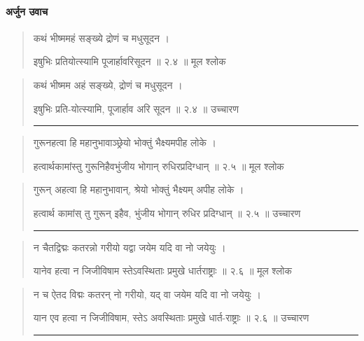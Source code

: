 \paragraph{\sanskrit अर्जुन उवाच}

\begin{quotation}

कथं भीष्ममहं सङ्‍ख्ये द्रोणं च मधुसूदन  ।  

इषुभिः प्रतियोत्स्यामि पूजार्हावरिसूदन  ॥ २.४ ॥  मूल श्लोक
\end{quotation}

\begin{quotation}

कथं भीष्मम अहं सङ्‍ख्ये, द्रोणं च मधुसूदन  ।  

इषुभिः प्रति-योत्स्यामि, पूजार्हाव अरि सूदन  ॥ २.४ ॥  उच्चारण

\noindent\rule{16cm}{0.4pt} 
\end{quotation}


\begin{quotation}
गुरूनहत्वा हि महानुभावाञ्छ्रेयो भोक्तुं भैक्ष्यमपीह लोके  ।  

हत्वार्थकामांस्तु गुरूनिहैवभुंजीय भोगान्‌ रुधिरप्रदिग्धान्‌  ॥ २.५ ॥  मूल श्लोक
\end{quotation}

\begin{quotation}

गुरून् अहत्वा हि महानुभावान्‌, 
श्रेयो भोक्तुं भैक्ष्यम् अपीह लोके  ।  

हत्वार्थ कामांस् तु गुरून् इहैव, 
भुंजीय भोगान्‌ रुधिर प्रदिग्धान्‌  ॥ २.५ ॥   उच्चारण

\noindent\rule{16cm}{0.4pt} 
\end{quotation}


\begin{quotation}

न चैतद्विद्मः कतरन्नो गरीयो
यद्वा जयेम यदि वा नो जयेयुः  ।  

यानेव हत्वा न जिजीविषाम
स्तेऽवस्थिताः प्रमुखे धार्तराष्ट्राः  ॥ २.६ ॥  मूल श्लोक
\end{quotation}

\begin{quotation}

न च ऐतद विद्मः कतरन् नो गरीयो, 
यद् वा जयेम यदि वा नो जयेयुः  ।  

यान एव हत्वा न जिजीविषाम, 
स्तेऽ अवस्थिताः प्रमुखे धार्त-राष्ट्राः  ॥ २.६ ॥  उच्चारण

\noindent\rule{16cm}{0.4pt} 
\end{quotation}


